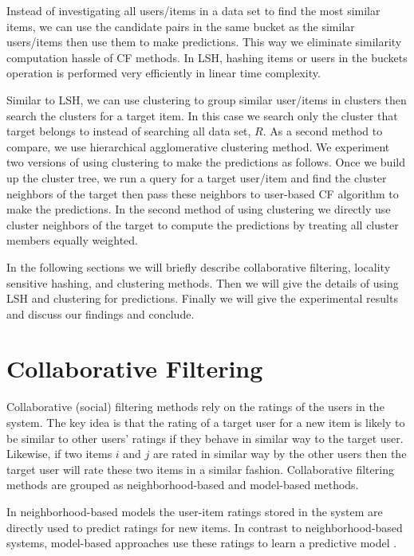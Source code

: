 \documentclass[conference]{IEEEtran}
\begin{document}
Instead of investigating all users/items in a data set to find the most similar
items, we can use the candidate pairs in the same bucket as the similar 
users/items then use them to make predictions. This way we eliminate similarity
computation hassle of CF methods. In LSH, hashing items or users in the buckets
operation is performed very efficiently in linear time complexity. 

Similar to LSH, we can use clustering to group similar user/items in clusters 
then search the clusters for a target item. In this case we search only the 
cluster that target belongs to instead of searching all data set, $R$. As a 
second method to compare, we use hierarchical agglomerative clustering method. 
We experiment two versions of using clustering to make the predictions as 
follows. Once we build up the cluster tree, we run a query for a target 
user/item and find the cluster neighbors of the target then pass these
neighbors to user-based CF algorithm to make the predictions. In the second 
method of using clustering we directly use cluster neighbors of the target to 
compute the predictions by treating all cluster members equally weighted.

In the following sections we will briefly describe collaborative filtering, 
locality sensitive hashing, and clustering methods. Then we will give the 
details of using LSH and clustering for predictions. Finally we will give the
experimental results and discuss our findings and conclude.

\section{Collaborative Filtering}
\label{sec:cf}

Collaborative (social) filtering methods rely on the ratings of the users in the 
system. The key idea is that the rating of a target user for a new item is likely 
to be similar to other users' ratings if they behave in similar way to the target 
user. Likewise, if two items $i$ and $j$ are rated in similar way by the other users 
then the target user will rate these two items in a similar fashion. Collaborative 
filtering methods are grouped as neighborhood-based and model-based methods. 

In  neighborhood-based models the user-item ratings stored in the system are
directly used to predict ratings for new items. In contrast to neighborhood-based 
systems, model-based approaches use these ratings to learn a predictive model 
\cite{DBLP:journals/ir/HerlockerKR02}.
\end{document}
